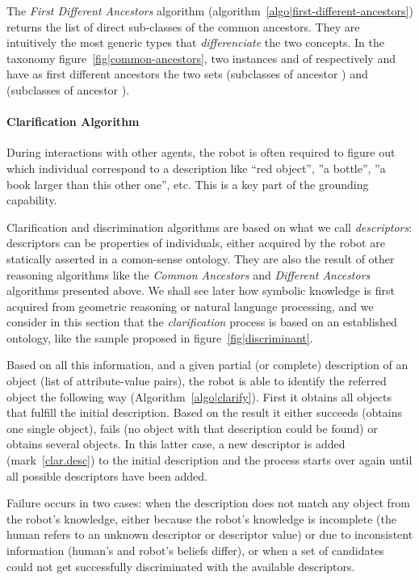 The \emph{First Different Ancestors} algorithm
(algorithm~\ref{algo|first-different-ancestors}) returns the list of direct
sub-classes of the common ancestors. They are intuitively the most generic
types that \emph{differenciate} the two concepts. In the taxonomy
figure~\ref{fig|common-ancestors}, two instances  and  of
respectively  and  have as first different
ancestors the two sets  (subclasses of ancestor
) and  (subclasses of
ancestor ).

\paragraph{Clarification Algorithm}
\label{sect|clarify}

During interactions with other agents, the robot is often required to figure
out which individual correspond to a description like ``red object'', ''a
bottle'', ''a book larger than this other one'', etc. This is a key part of the
grounding capability.

Clarification and discrimination algorithms are based on what we call
\emph{descriptors}: descriptors can be properties of individuals, either
acquired by the robot are statically asserted in a comon-sense ontology. They
are also the result of other reasoning algorithms like the \emph{Common
Ancestors} and \emph{Different Ancestors} algorithms presented above.
We shall see later how symbolic knowledge is first acquired from geometric
reasoning or natural language processing, and we consider in this section that
the \emph{clarification} process is based on an established ontology, like the
sample proposed in figure~\ref{fig|discriminant}.

Based on all this information, and a given partial (or complete) description of
an object (list of attribute-value pairs), the robot is able to identify the
referred object the following way (Algorithm~\ref{algo|clarify}). First it
obtains all objects that fulfill the initial description. Based on the result
it either succeeds (obtains one single object), fails (no object with that
description could be found) or obtains several objects. In this latter case, a
new descriptor is added (mark~\ref{clar.desc}) to the initial description and
the process starts over again until all possible descriptors have been added.

Failure occurs in two cases: when the description does not match any object
from the robot's knowledge, either because the robot's knowledge is incomplete
(the human refers to an unknown descriptor or descriptor value) or due to
inconsistent information (human's and robot's beliefs differ), or when a set of
candidates could not get successfully discriminated with the available
descriptors.

